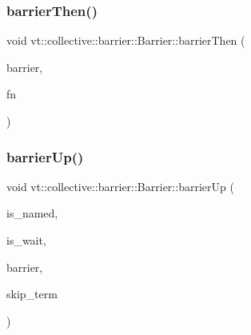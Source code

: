 \subsubsection{\texorpdfstring{barrier\+Then()}{barrierThen()}\hspace{0.1cm}{\footnotesize\ttfamily [2/2]}}
{\footnotesize\ttfamily void vt\+::collective\+::barrier\+::\+Barrier\+::barrier\+Then (\begin{DoxyParamCaption}\item[{\hyperlink{namespacevt_a25e481f0d6bbc7204db23d1c87a62e77}{Barrier\+Type} const \&}]{barrier,  }\item[{\hyperlink{namespacevt_ae0a5a7b18cc99d7b732cb4d44f46b0f3}{Action\+Type}}]{fn }\end{DoxyParamCaption})\hspace{0.3cm}{\ttfamily [inline]}}

\mbox{\label{structvt_1_1collective_1_1barrier_1_1_barrier_a79096d77724cb095c08696e8af673dfb}} 
\subsubsection{\texorpdfstring{barrier\+Up()}{barrierUp()}\hspace{0.1cm}{\footnotesize\ttfamily [1/2]}}
{\footnotesize\ttfamily void vt\+::collective\+::barrier\+::\+Barrier\+::barrier\+Up (\begin{DoxyParamCaption}\item[{bool const \&}]{is\+\_\+named,  }\item[{bool const \&}]{is\+\_\+wait,  }\item[{\hyperlink{namespacevt_a25e481f0d6bbc7204db23d1c87a62e77}{Barrier\+Type} const \&}]{barrier,  }\item[{bool const \&}]{skip\+\_\+term }\end{DoxyParamCaption})}

\mbox{\label{structvt_1_1collective_1_1barrier_1_1_barrier_ab229e28e7dea8c0dcdaf07b13173984d}} 
